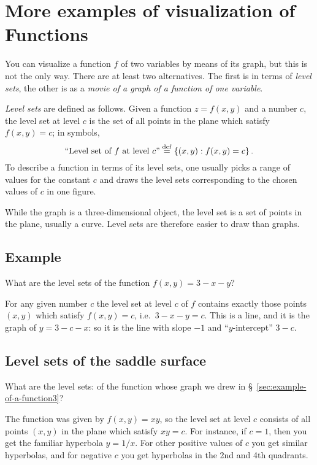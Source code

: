 \section{More examples of visualization of Functions} %

You can visualize a function $f$ of two variables by means of its
graph, but this is not the only way.  There are at least two
alternatives.  The first is in terms of \emph{level sets}, the other
is as a \emph{movie of a graph of a function of one variable}.

\emph{Level sets} are defined as follows.  Given a function $z=f(x,
y)$ and a number $c$, the level set at level $c$ is the set of all
points in the plane which satisfy $f(x, y) = c$; in symbols,
\[
\text{``Level set of $f$ at level $c$''}
\stackrel{\rm def}{=}
\left\{ (x, y) : f(x, y) = c \right\}.
\]
To describe a function in terms of its level sets, one usually picks a
range of values for the constant $c$ and draws the level sets
corresponding to the chosen values of $c$ in one figure.

While the graph is a three-dimensional object, the level set is a set
of points in the plane, usually a curve.  Level sets are therefore
easier to draw than graphs.

\subsection{Example}\label{sec:01levelsetexample} %
What are the level sets of the function $f(x, y) = 3-x-y$?

For any given number $c$ the level set at level $c$ of $f$ contains
exactly those points $(x, y)$ which satisfy $f(x, y) = c$, i.e.\
$3-x-y = c$.  This is a line, and it is the graph of $y= 3-c-x$:  so
it is the line with slope $-1$ and ``$y$-intercept'' $3-c$.


\subsection{Level sets of the saddle surface}  What are the level sets: %
of the function whose graph we drew in \S~\ref{sec:example-of-a-function3}?

The function was given by $f(x, y)= xy$, so the level set at level
$c$ consists of all points $(x, y)$ in the plane which satisfy
$xy=c$.  For instance, if $c=1$, then you get the familiar hyperbola
$y=1/x$.  For other positive values of $c$ you get similar hyperbolas,
and for negative $c$ you get hyperbolas in the 2nd and 4th quadrants.

